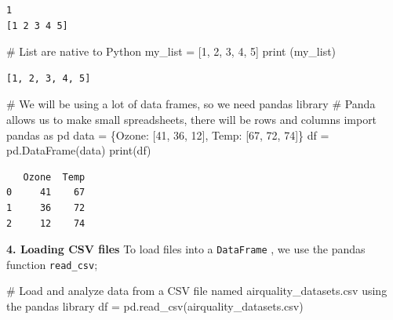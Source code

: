\documentclass[
  letterpaper,
  DIV=11,
  numbers=noendperiod]{scrreprt}
\newenvironment{Shaded}{\begin{snugshade}}{\end{snugshade}}
\newcommand{\BuiltInTok}[1]{\textcolor[rgb]{0.00,0.23,0.31}{#1}}
\newcommand{\CommentTok}[1]{\textcolor[rgb]{0.37,0.37,0.37}{#1}}
\newcommand{\DecValTok}[1]{\textcolor[rgb]{0.68,0.00,0.00}{#1}}
\newcommand{\ImportTok}[1]{\textcolor[rgb]{0.00,0.46,0.62}{#1}}
\newcommand{\NormalTok}[1]{\textcolor[rgb]{0.00,0.23,0.31}{#1}}
\newcommand{\OperatorTok}[1]{\textcolor[rgb]{0.37,0.37,0.37}{#1}}
\newcommand{\StringTok}[1]{\textcolor[rgb]{0.13,0.47,0.30}{#1}}
\begin{document}
\begin{verbatim}
1
[1 2 3 4 5]
\end{verbatim}

\begin{Shaded}
\begin{Highlighting}[]
\CommentTok{\# List are native to Python}
\NormalTok{my\_list }\OperatorTok{=}\NormalTok{ [}\DecValTok{1}\NormalTok{, }\DecValTok{2}\NormalTok{, }\DecValTok{3}\NormalTok{, }\DecValTok{4}\NormalTok{, }\DecValTok{5}\NormalTok{]}
\BuiltInTok{print}\NormalTok{ (my\_list)}
\end{Highlighting}
\end{Shaded}

\begin{verbatim}
[1, 2, 3, 4, 5]
\end{verbatim}

\begin{Shaded}
\begin{Highlighting}[]
\CommentTok{\# We will be using a lot of data frames, so we need pandas library}
\CommentTok{\# Panda allows us to make small spreadsheets, there will be rows and columns}
\ImportTok{import}\NormalTok{ pandas }\ImportTok{as}\NormalTok{ pd}
\NormalTok{data }\OperatorTok{=}\NormalTok{ \{}\StringTok{\textquotesingle{}Ozone\textquotesingle{}}\NormalTok{: [}\DecValTok{41}\NormalTok{, }\DecValTok{36}\NormalTok{, }\DecValTok{12}\NormalTok{], }\StringTok{\textquotesingle{}Temp\textquotesingle{}}\NormalTok{: [}\DecValTok{67}\NormalTok{, }\DecValTok{72}\NormalTok{, }\DecValTok{74}\NormalTok{]\}}
\NormalTok{df }\OperatorTok{=}\NormalTok{ pd.DataFrame(data)}
\BuiltInTok{print}\NormalTok{(df)}
\end{Highlighting}
\end{Shaded}

\begin{verbatim}
   Ozone  Temp
0     41    67
1     36    72
2     12    74
\end{verbatim}

\textbf{4. Loading CSV files} To load files into a \texttt{DataFrame} ,
we use the pandas function \texttt{read\_csv};

\begin{Shaded}
\begin{Highlighting}[]
\CommentTok{\# Load and analyze data from a CSV file named airquality\_datasets.csv using the pandas library}
\NormalTok{df }\OperatorTok{=}\NormalTok{ pd.read\_csv(}\StringTok{\textquotesingle{}airquality\_datasets.csv\textquotesingle{}}\NormalTok{)}
\end{Highlighting}
\end{Shaded}
\end{document}
